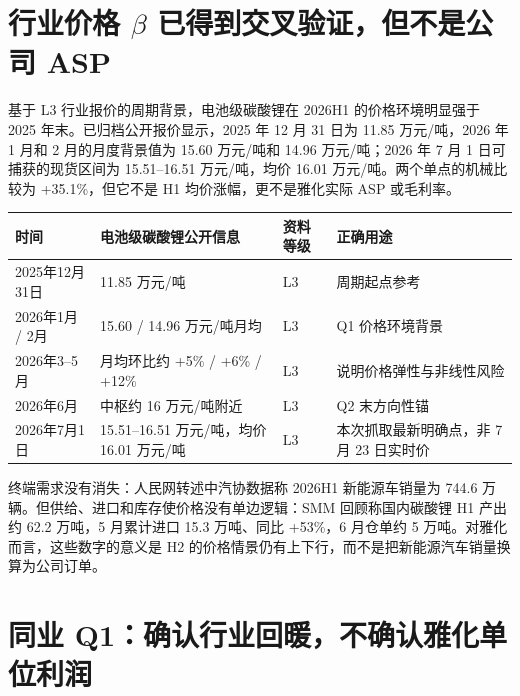\section{行业价格 $\beta$ 已得到交叉验证，但不是公司 ASP}

基于 L3 行业报价的周期背景，电池级碳酸锂在 2026H1 的价格环境明显强于 2025 年末。已归档公开报价显示，2025 年 12 月 31 日为 11.85 万元/吨，2026 年 1 月和 2 月的月度背景值为 15.60 万元/吨和 14.96 万元/吨；2026 年 7 月 1 日可捕获的现货区间为 15.51--16.51 万元/吨，均价 16.01 万元/吨。两个单点的机械比较为 +35.1\%，但它不是 H1 均价涨幅，更不是雅化实际 ASP 或毛利率。

\begin{exhibitbox}
\begin{tabularx}{\exhibitboxwidth}{L{2.4cm}L{3.6cm}L{1.5cm}X}
\toprule
时间 & 电池级碳酸锂公开信息 & 资料等级 & 正确用途 \\
\midrule
2025年12月31日 & 11.85 万元/吨 & L3 & 周期起点参考 \\
2026年1月 / 2月 & 15.60 / 14.96 万元/吨月均 & L3 & Q1 价格环境背景 \\
2026年3--5月 & 月均环比约 +5\% / +6\% / +12\% & L3 & 说明价格弹性与非线性风险 \\
2026年6月 & 中枢约 16 万元/吨附近 & L3 & Q2 末方向性锚 \\
2026年7月1日 & 15.51--16.51 万元/吨，均价 16.01 万元/吨 & L3 & 本次抓取最新明确点，非 7 月 23 日实时价 \\
\bottomrule
\end{tabularx}
\end{exhibitbox}

终端需求没有消失：人民网转述中汽协数据称 2026H1 新能源车销量为 744.6 万辆。但供给、进口和库存使价格没有单边逻辑：SMM 回顾称国内碳酸锂 H1 产出约 62.2 万吨，5 月累计进口 15.3 万吨、同比 +53\%，6 月仓单约 5 万吨。对雅化而言，这些数字的意义是 H2 的价格情景仍有上下行，而不是把新能源汽车销量换算为公司订单。

\section{同业 Q1：确认行业回暖，不确认雅化单位利润}


